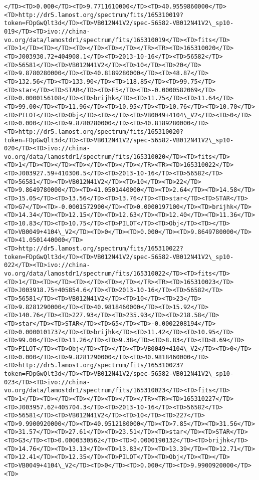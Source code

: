 \documentclass[11pt]{article}
\begin{document}
\begin{Verbatim}[commandchars=\\\{\}]
</TD><TD>0.000</TD><TD>9.7711610000</TD><TD>40.9559860000</TD><TD>http://dr5.lamost.org/spectrum/fits/165310019?token=FDpGwQlt3d</TD><TD>VB012N41V2/spec-56582-VB012N41V2\_sp10-019</TD><TD>ivo://china-vo.org/data/lamostdr1/spectrum/fits/165310019</TD><TD>fits</TD><TD>1</TD><TD></TD><TD></TD><TD></TD></TR><TR><TD>165310020</TD><TD>J003930.72+404908.1</TD><TD>2013-10-16</TD><TD>56582</TD><TD>56581</TD><TD>VB012N41V2</TD><TD>10</TD><TD>20</TD><TD>9.8780280000</TD><TD>40.8189280000</TD><TD>48.87</TD><TD>132.56</TD><TD>133.90</TD><TD>118.85</TD><TD>99.75</TD><TD>star</TD><TD>STAR</TD><TD>F5</TD><TD>-0.0000582069</TD><TD>0.0000156108</TD><TD>brijhk</TD><TD>11.75</TD><TD>11.64</TD><TD>99.00</TD><TD>11.96</TD><TD>10.95</TD><TD>10.76</TD><TD>10.70</TD><TD>PILOT</TD><TD>Obj</TD><TD></TD><TD>VB0049+4104\_V2</TD><TD>0</TD><TD>0.000</TD><TD>9.8780280000</TD><TD>40.8189280000</TD><TD>http://dr5.lamost.org/spectrum/fits/165310020?token=FDpGwQlt3d</TD><TD>VB012N41V2/spec-56582-VB012N41V2\_sp10-020</TD><TD>ivo://china-vo.org/data/lamostdr1/spectrum/fits/165310020</TD><TD>fits</TD><TD>1</TD><TD></TD><TD></TD><TD></TD></TR><TR><TD>165310022</TD><TD>J003927.59+410300.5</TD><TD>2013-10-16</TD><TD>56582</TD><TD>56581</TD><TD>VB012N41V2</TD><TD>10</TD><TD>22</TD><TD>9.8649780000</TD><TD>41.0501440000</TD><TD>2.64</TD><TD>14.58</TD><TD>15.05</TD><TD>13.56</TD><TD>13.76</TD><TD>star</TD><TD>STAR</TD><TD>G7</TD><TD>-0.0001572900</TD><TD>0.0000197100</TD><TD>brijhk</TD><TD>14.34</TD><TD>12.15</TD><TD>12.63</TD><TD>12.40</TD><TD>11.36</TD><TD>10.83</TD><TD>10.75</TD><TD>PILOT</TD><TD>Obj</TD><TD></TD><TD>VB0049+4104\_V2</TD><TD>0</TD><TD>0.000</TD><TD>9.8649780000</TD><TD>41.0501440000</TD><TD>http://dr5.lamost.org/spectrum/fits/165310022?token=FDpGwQlt3d</TD><TD>VB012N41V2/spec-56582-VB012N41V2\_sp10-022</TD><TD>ivo://china-vo.org/data/lamostdr1/spectrum/fits/165310022</TD><TD>fits</TD><TD>1</TD><TD></TD><TD></TD><TD></TD></TR><TR><TD>165310023</TD><TD>J003918.75+405854.6</TD><TD>2013-10-16</TD><TD>56582</TD><TD>56581</TD><TD>VB012N41V2</TD><TD>10</TD><TD>23</TD><TD>9.8281290000</TD><TD>40.9818460000</TD><TD>15.92</TD><TD>140.76</TD><TD>227.93</TD><TD>235.93</TD><TD>218.58</TD><TD>star</TD><TD>STAR</TD><TD>G5</TD><TD>-0.0002208194</TD><TD>0.0000101737</TD><TD>brijhk</TD><TD>11.42</TD><TD>10.95</TD><TD>99.00</TD><TD>11.26</TD><TD>9.38</TD><TD>8.83</TD><TD>8.69</TD><TD>PILOT</TD><TD>Obj</TD><TD></TD><TD>VB0049+4104\_V2</TD><TD>0</TD><TD>0.000</TD><TD>9.8281290000</TD><TD>40.9818460000</TD><TD>http://dr5.lamost.org/spectrum/fits/165310023?token=FDpGwQlt3d</TD><TD>VB012N41V2/spec-56582-VB012N41V2\_sp10-023</TD><TD>ivo://china-vo.org/data/lamostdr1/spectrum/fits/165310023</TD><TD>fits</TD><TD>1</TD><TD></TD><TD></TD><TD></TD></TR><TR><TD>165310227</TD><TD>J003957.62+405704.3</TD><TD>2013-10-16</TD><TD>56582</TD><TD>56581</TD><TD>VB012N41V2</TD><TD>10</TD><TD>227</TD><TD>9.9900920000</TD><TD>40.9512180000</TD><TD>7.85</TD><TD>31.56</TD><TD>31.57</TD><TD>27.61</TD><TD>23.51</TD><TD>star</TD><TD>STAR</TD><TD>G3</TD><TD>0.0000330562</TD><TD>0.0000190132</TD><TD>brijhk</TD><TD>14.76</TD><TD>13.13</TD><TD>13.83</TD><TD>13.39</TD><TD>12.71</TD><TD>12.41</TD><TD>12.35</TD><TD>PILOT</TD><TD>Obj</TD><TD></TD><TD>VB0049+4104\_V2</TD><TD>0</TD><TD>0.000</TD><TD>9.9900920000</TD><TD>
\end{Verbatim}
\end{document}
